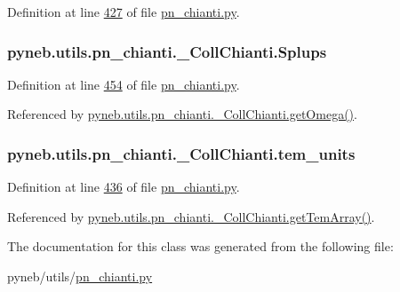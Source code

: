 Definition at line \hyperlink{pn__chianti_8py_source_l00427}{427} of file \hyperlink{pn__chianti_8py_source}{pn\-\_\-chianti.\-py}.

\hypertarget{classpyneb_1_1utils_1_1pn__chianti_1_1___coll_chianti_abbdbf5533a480f46baceccc2885d7467}{
\subsubsection[{Splups}]{\setlength{\rightskip}{0pt plus 5cm}pyneb.\-utils.\-pn\-\_\-chianti.\-\_\-\-Coll\-Chianti.\-Splups}}\label{classpyneb_1_1utils_1_1pn__chianti_1_1___coll_chianti_abbdbf5533a480f46baceccc2885d7467}


Definition at line \hyperlink{pn__chianti_8py_source_l00454}{454} of file \hyperlink{pn__chianti_8py_source}{pn\-\_\-chianti.\-py}.



Referenced by \hyperlink{pn__chianti_8py_source_l00507}{pyneb.\-utils.\-pn\-\_\-chianti.\-\_\-\-Coll\-Chianti.\-get\-Omega()}.

\hypertarget{classpyneb_1_1utils_1_1pn__chianti_1_1___coll_chianti_ac8f0c1513ef4a2f2d12c59fa380a495c}{
\subsubsection[{tem\-\_\-units}]{\setlength{\rightskip}{0pt plus 5cm}pyneb.\-utils.\-pn\-\_\-chianti.\-\_\-\-Coll\-Chianti.\-tem\-\_\-units}}\label{classpyneb_1_1utils_1_1pn__chianti_1_1___coll_chianti_ac8f0c1513ef4a2f2d12c59fa380a495c}


Definition at line \hyperlink{pn__chianti_8py_source_l00436}{436} of file \hyperlink{pn__chianti_8py_source}{pn\-\_\-chianti.\-py}.



Referenced by \hyperlink{pn__chianti_8py_source_l00551}{pyneb.\-utils.\-pn\-\_\-chianti.\-\_\-\-Coll\-Chianti.\-get\-Tem\-Array()}.



The documentation for this class was generated from the following file\-:\begin{DoxyCompactItemize}
\item 
pyneb/utils/\hyperlink{pn__chianti_8py}{pn\-\_\-chianti.\-py}\end{DoxyCompactItemize}
